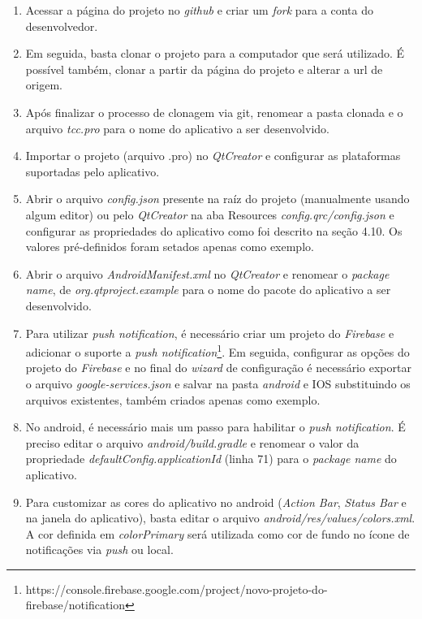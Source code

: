 \begin{enumerate}
	\item Acessar a página do projeto no \textit{github} e criar um \textit{fork} para a conta do desenvolvedor.

	\item Em seguida, basta clonar o projeto para a computador que será utilizado. É possível também, clonar a partir da página do projeto e alterar a url de origem.

	\item Após finalizar o processo de clonagem via git, renomear a pasta clonada e o arquivo \textit{tcc.pro} para o nome do aplicativo a ser desenvolvido.

	\item Importar o projeto (arquivo .pro) no \textit{QtCreator} e configurar as plataformas suportadas pelo aplicativo.

	\item Abrir o arquivo \textit{config.json} presente na raíz do projeto (manualmente usando algum editor) ou pelo \textit{QtCreator} na aba Resources \textit{config.qrc/config.json} e configurar as propriedades do aplicativo como foi descrito na seção 4.10. Os valores pré-definidos foram setados apenas como exemplo.

	\item Abrir o arquivo \textit{AndroidManifest.xml} no \textit{QtCreator} e renomear o \textit{package name}, de \textit{org.qtproject.example} para o nome do pacote do aplicativo a ser desenvolvido.

	\item Para utilizar \textit{push notification}, é necessário criar um projeto do \textit{Firebase} e adicionar o suporte a \textit{push notification}\footnote{https://console.firebase.google.com/project/novo-projeto-do-firebase/notification}. Em seguida, configurar as opções do projeto do \textit{Firebase} e no final do \textit{wizard} de configuração é necessário exportar o arquivo \textit{google-services.json} e salvar na pasta \textit{android} e IOS substituindo os arquivos existentes, também criados apenas como exemplo.

	\item No android, é necessário mais um passo para habilitar o \textit{push notification}. É preciso editar o arquivo \textit{android/build.gradle} e renomear o valor da propriedade \textit{defaultConfig.applicationId} (linha 71) para o \textit{package name} do aplicativo.

	\item Para customizar as cores do aplicativo no android (\textit{Action Bar}, \textit{Status Bar} e na janela do aplicativo), basta editar o arquivo \textit{android/res/values/colors.xml}. A cor definida em \textit{colorPrimary} será utilizada como cor de fundo no ícone de notificações via \textit{push} ou local.


\end{enumerate}
